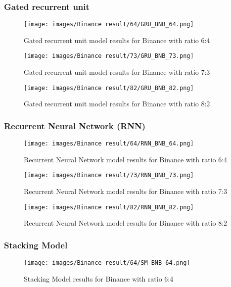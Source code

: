 \documentclass{ieeeojies}
\begin{document}
\subsubsection{Gated recurrent unit}
\begin{figure}[H]
  \centering
\texttt{[image: images/Binance result/64/GRU\_BNB\_64.png]}\\
  \caption{Gated recurrent unit model results for Binance with ratio 6:4}
  \label{fig:gru_bn_64}
\end{figure}

\begin{figure}[H]
  \centering
\texttt{[image: images/Binance result/73/GRU\_BNB\_73.png]}\\
  \caption{Gated recurrent unit model results for Binance with ratio 7:3}
  \label{fig:gru_bn_73}
\end{figure}

\begin{figure}[H]
  \centering
\texttt{[image: images/Binance result/82/GRU\_BNB\_82.png]}
  \caption{Gated recurrent unit model results for Binance with ratio 8:2}
  \label{fig:gru_bn_82}
\end{figure}


\subsubsection{Recurrent Neural Network (RNN)}
\begin{figure}[H]
  \centering
\texttt{[image: images/Binance result/64/RNN\_BNB\_64.png]}\\
  \caption{Recurrent Neural Network model results for Binance with ratio 6:4}
  \label{fig:rnn_bn_64}
\end{figure}


\begin{figure}[H]
  \centering
\texttt{[image: images/Binance result/73/RNN\_BNB\_73.png]}\\
  \caption{Recurrent Neural Network model results for Binance with ratio 7:3}
  \label{fig:rnn_bn_73}
\end{figure}


\begin{figure}[H]
  \centering
\texttt{[image: images/Binance result/82/RNN\_BNB\_82.png]}
  \caption{Recurrent Neural Network model results for Binance with ratio 8:2}
  \label{fig:rnn_bn_82}
\end{figure}


\subsubsection{Stacking Model}
\begin{figure}[H]
  \centering
\texttt{[image: images/Binance result/64/SM\_BNB\_64.png]}\\
  \caption{Stacking Model results for Binance with ratio 6:4}
  \label{fig:stackmodel_bn_64}
\end{figure}
\end{document}
